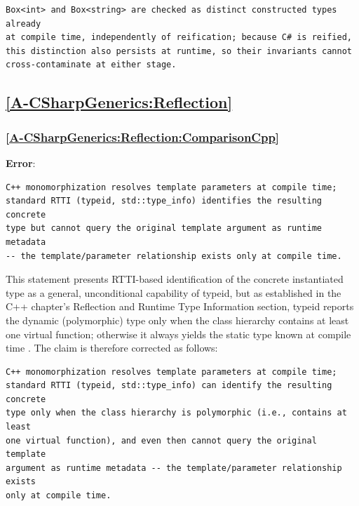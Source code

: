 \documentclass[11pt]{report}
\begin{document}
\begin{Verbatim}[breaklines=true]
Box<int> and Box<string> are checked as distinct constructed types already
at compile time, independently of reification; because C# is reified,
this distinction also persists at runtime, so their invariants cannot
cross-contaminate at either stage.
\end{Verbatim}


\subsection*{\hyperref[A-CSharpGenerics:Reflection]{\ref*{A-CSharpGenerics:Reflection} }}

\subsubsection*{\hyperref[A-CSharpGenerics:Reflection:ComparisonCpp]{\ref*{A-CSharpGenerics:Reflection:ComparisonCpp} }}
\noindent\textbf{Error}:

\begin{Verbatim}[breaklines=true]
C++ monomorphization resolves template parameters at compile time;
standard RTTI (typeid, std::type_info) identifies the resulting concrete
type but cannot query the original template argument as runtime metadata
-- the template/parameter relationship exists only at compile time.
\end{Verbatim}

This statement presents RTTI-based identification of the concrete
instantiated type as a general, unconditional capability of typeid, but
as established in the C++ chapter's Reflection and Runtime Type
Information section, typeid reports the dynamic (polymorphic) type only
when the class hierarchy contains at least one virtual function;
otherwise it always yields the static type known at compile time
\cite{cppreference}. The claim is therefore corrected as follows:

\begin{Verbatim}[breaklines=true]
C++ monomorphization resolves template parameters at compile time;
standard RTTI (typeid, std::type_info) can identify the resulting concrete
type only when the class hierarchy is polymorphic (i.e., contains at least
one virtual function), and even then cannot query the original template
argument as runtime metadata -- the template/parameter relationship exists
only at compile time.
\end{Verbatim}
\end{document}

